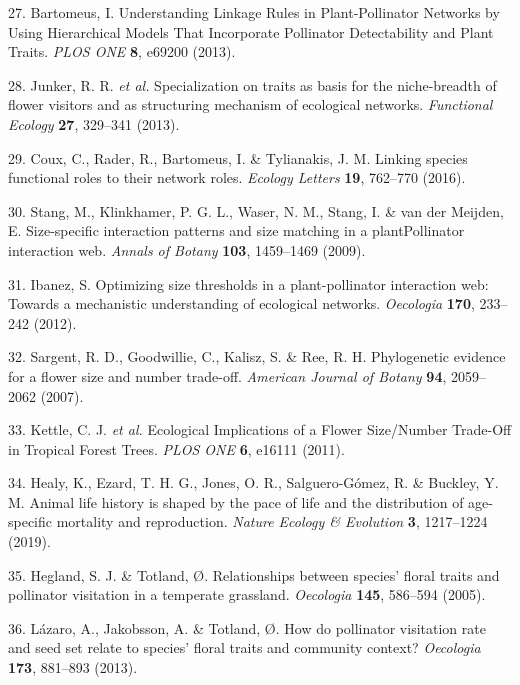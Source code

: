 \documentclass[12pt,a4paper,]{article}
\begin{document}
\hypertarget{ref-bartomeus2013}{}
27. Bartomeus, I. Understanding Linkage Rules in Plant-Pollinator
Networks by Using Hierarchical Models That Incorporate Pollinator
Detectability and Plant Traits. \emph{PLOS ONE} \textbf{8}, e69200
(2013).

\hypertarget{ref-junker2013}{}
28. Junker, R. R. \emph{et al.} Specialization on traits as basis for
the niche-breadth of flower visitors and as structuring mechanism of
ecological networks. \emph{Functional Ecology} \textbf{27}, 329--341
(2013).

\hypertarget{ref-coux2016}{}
29. Coux, C., Rader, R., Bartomeus, I. \& Tylianakis, J. M. Linking
species functional roles to their network roles. \emph{Ecology Letters}
\textbf{19}, 762--770 (2016).

\hypertarget{ref-stang2009}{}
30. Stang, M., Klinkhamer, P. G. L., Waser, N. M., Stang, I. \& van der
Meijden, E. Size-specific interaction patterns and size matching in a
plantPollinator interaction web. \emph{Annals of Botany} \textbf{103},
1459--1469 (2009).

\hypertarget{ref-ibanez2012}{}
31. Ibanez, S. Optimizing size thresholds in a plant-pollinator
interaction web: Towards a mechanistic understanding of ecological
networks. \emph{Oecologia} \textbf{170}, 233--242 (2012).

\hypertarget{ref-sargent2007}{}
32. Sargent, R. D., Goodwillie, C., Kalisz, S. \& Ree, R. H.
Phylogenetic evidence for a flower size and number trade-off.
\emph{American Journal of Botany} \textbf{94}, 2059--2062 (2007).

\hypertarget{ref-kettle2011}{}
33. Kettle, C. J. \emph{et al.} Ecological Implications of a Flower
Size/Number Trade-Off in Tropical Forest Trees. \emph{PLOS ONE}
\textbf{6}, e16111 (2011).

\hypertarget{ref-healy2019}{}
34. Healy, K., Ezard, T. H. G., Jones, O. R., Salguero-Gómez, R. \&
Buckley, Y. M. Animal life history is shaped by the pace of life and the
distribution of age-specific mortality and reproduction. \emph{Nature
Ecology \& Evolution} \textbf{3}, 1217--1224 (2019).

\hypertarget{ref-hegland2005}{}
35. Hegland, S. J. \& Totland, Ø. Relationships between species' floral
traits and pollinator visitation in a temperate grassland.
\emph{Oecologia} \textbf{145}, 586--594 (2005).

\hypertarget{ref-lazaro2013}{}
36. Lázaro, A., Jakobsson, A. \& Totland, Ø. How do pollinator
visitation rate and seed set relate to species' floral traits and
community context? \emph{Oecologia} \textbf{173}, 881--893 (2013).
\end{document}
